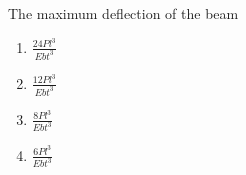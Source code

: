 \iffalse
\chapter{2011}
\section{me}
\author{AI24BTECH11023 - Tarun Reddy Pakala}
\fi
\item The maximum deflection of the beam
\begin{enumerate}
    \item $\frac{24Pl^3}{Ebt^3}$
    \item $\frac{12Pl^3}{Ebt^3}$
    \item $\frac{8Pl^3}{Ebt^3}$
    \item $\frac{6Pl^3}{Ebt^3}$
\end{enumerate}
